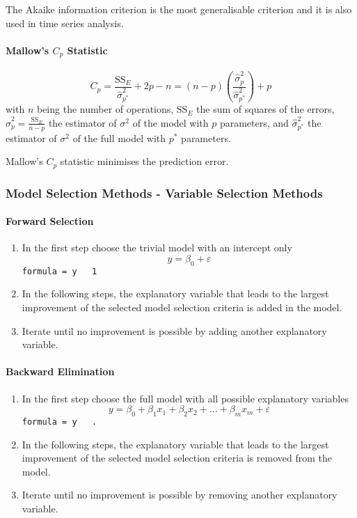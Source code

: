 \documentclass[11pt]{article}
\theoremstyle{definition}
\begin{document}
The Akaike information criterion is the most generalisable criterion and it is also used in time series analysis.

\paragraph{Mallow's $C_p$ Statistic}
\begin{equation*}
	C_p = \frac{\text{SS}_{E}}{\hat{\sigma}_{p^*}^2} + 2p - n = (n-p)\left(\frac{\hat{\sigma}_{p}^2}{\hat{\sigma}_{p^*}^2}\right) + p
\end{equation*}
with $n$ being the number of operations, $\text{SS}_E$ the sum of squares of the errors, $\hat{\sigma}_{p}^2 = \frac{\text{SS}_E}{n-p}$ the estimator of $\sigma^2$ of the model with $p$ parameters, and $\hat{\sigma}_{p^*}^2$ the estimator of $\sigma^2$ of the full model with $p^*$ parameters.

Mallow’s $C_p$ statistic minimises the prediction error.

\subsubsection{Model Selection Methods - Variable Selection Methods}
\paragraph{Forward Selection}
\begin{enumerate}
	\item In the first step choose the trivial model with an intercept only
	\begin{equation*}
		y=\beta_0 + \varepsilon
	\end{equation*}
	\texttt{formula = y ~ 1}
	\item In the following steps, the explanatory variable that leads to the largest improvement of the selected model selection criteria is added in the model.
	\item Iterate until no improvement is possible by adding another explanatory variable.
\end{enumerate}

\paragraph{Backward Elimination}
\begin{enumerate}
	\item In the first step choose the full model with all possible explanatory variables
	\begin{equation*}
		y=\beta_0 + \beta_1 x_1 + \beta_2 x_2 + \dots + \beta_m x_m + \varepsilon
	\end{equation*}
	\texttt{formula = y ~ .}
	\item In the following steps, the explanatory variable that leads to the largest improvement of the selected model selection criteria is removed from the model.
	\item Iterate until no improvement is possible by removing another explanatory variable.
\end{enumerate}
\end{document}
